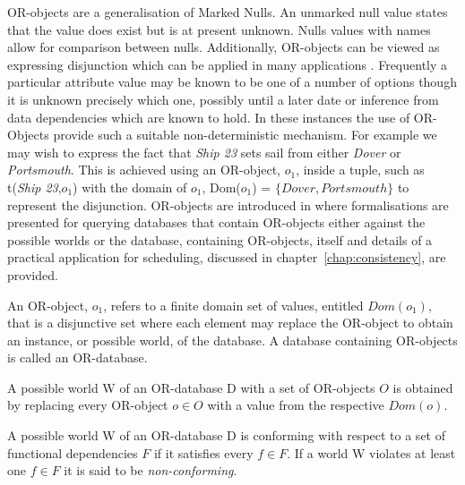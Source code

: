 OR-objects \cite{inv91} are a generalisation of Marked Nulls. An unmarked null
value states that the value does exist but is at present
unknown. Nulls values with names allow for comparison between nulls.
Additionally, OR-objects can be viewed as expressing disjunction which
can be applied in many applications .  Frequently a particular
attribute value may be known to be one of a number of options though
it is unknown precisely which one, possibly until a later date or
inference from data dependencies which are known to hold.  In these
instances the use of OR-Objects provide such a suitable
non-deterministic mechanism.  For example we may wish to express the
fact that {\em Ship 23} sets sail from either {\em Dover} or {\em
Portsmouth}.  This is achieved using an OR-object, $o_1$, inside a
tuple, such as t({\em Ship 23},$o_1$) with the domain of $o_1$, Dom($o_1$) = $\{Dover,Portsmouth\}$ to represent the disjunction.
OR-objects are introduced in \cite{inv91} where formalisations are
presented for querying databases that contain OR-objects either
against the possible worlds or the database, containing OR-objects,
itself and details of a practical application for scheduling,
discussed in chapter~\ref{chap:consistency}, are provided.

\begin{definition}[OR-Object]
\begin{rm}
An OR-object, $o_1$, refers to a finite domain set of values, entitled
$Dom(o_1)$, that is a disjunctive set where each element may replace
the OR-object to obtain an instance, or possible world, of the
database. A database containing OR-objects is called an OR-database.
\end{rm}
\end{definition}


\begin{definition}
\begin{rm}
A possible world W of an OR-database  D with a set of OR-objects $O$
is obtained by replacing every OR-object $o \in O$ with a value from the
respective $Dom(o)$.
\end{rm}
\end{definition}

\begin{definition}
\begin{rm}
A possible world W of an OR-database  D is conforming with respect to a set of
functional dependencies $F$ if it satisfies every $f \in F$.  If a world W violates
at least one   $f \in F$ it is said to be {\em non-conforming}.
\end{rm}
\end{definition}

